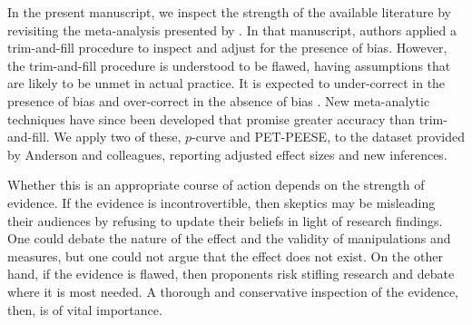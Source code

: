 \documentclass[man]{apa6}
\begin{document}
In the present manuscript, we inspect the strength of the available literature by revisiting the meta-analysis presented by \citet{Anderson:etal:2010}. In that manuscript, authors applied a trim-and-fill procedure \citep{Duval:Tweedie:2000} to inspect and adjust for the presence of bias. 
However, the trim-and-fill procedure is understood to be flawed, having assumptions that are likely to be unmet in actual practice. It is expected to under-correct in the presence of bias and over-correct in the absence of bias \citep{Peters:etal:2007,Simonsohn:DATACOLADAPOST}.
New meta-analytic techniques have since been developed that promise greater accuracy than trim-and-fill. We apply two of these, $p$-curve and PET-PEESE, to the dataset provided by Anderson and colleagues, reporting adjusted effect sizes and new inferences.

Whether this is an appropriate course of action depends on the strength of evidence. If the evidence is incontrovertible, then skeptics may be misleading their audiences by refusing to update their beliefs in light of research findings. One could debate the nature of the effect and the validity of manipulations and measures, but one could not argue that the effect does not exist. On the other hand, if the evidence is flawed, then proponents risk stifling research and debate where it is most needed. A thorough and conservative inspection of the evidence, then, is of vital importance.

\end{document}

